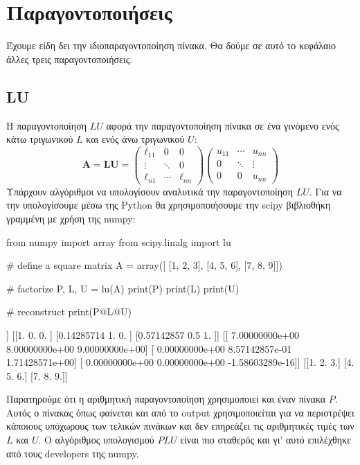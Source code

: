 \chapter{Παραγοντοποιήσεις}
Έχουμε είδη δει την ιδιοπαραγοντοποίηση πίνακα. Θα δούμε σε αυτό το κεφάλαιο άλλες τρεις παραγοντοποιήσεις. 
\section{{\en LU}}
Η παραγοντοποίηση $LU$ αφορά την παραγοντοποίηση πίνακα σε ένα γινόμενο ενός κάτω τριγωνικού $L$ και ενός άνω τριγωνικού $U$:
\begin{equation}
\mathbf{A} = \mathbf{L}\mathbf{U} =
\left( \begin{array}{ccc}
\ell_{11} & 0 & 0 \\
\vdots & \ddots & 0 \\
\ell_{n1} & \cdots & \ell_{nn}
\end{array}\right)
\left( 
\begin{array}{ccc}
u_{11} & \cdots & u_{nn} \\
0 & \ddots & \vdots \\
0 & 0 & u_{nn}
\end{array}
\right)
\end{equation}
Υπάρχουν αλγόριθμοι να υπολογίσουν αναλυτικά την παραγοντοποίηση $LU$. Για να την υπολογίσουμε μέσω της {\en Python} θα χρησιμοποιήσουμε την {\en scipy} βιβλιοθήκη γραμμένη με χρήση της {\en numpy}:
\en
\begin{python}
from numpy import array
from scipy.linalg import lu

# define a square matrix
A = array([
[1, 2, 3],
[4, 5, 6],
[7, 8, 9]])

# factorize
P, L, U = lu(A)
print(P)
print(L)
print(U)

# reconstruct
print(P@L@U)
\end{python}
\vspace*{-0.7cm}
\begin{codeout}
[[0. 1. 0.]
 [0. 0. 1.]
 [1. 0. 0.]]
[[1.         0.         0.        ]
 [0.14285714 1.         0.        ]
 [0.57142857 0.5        1.        ]]
[[ 7.00000000e+00  8.00000000e+00  9.00000000e+00]
 [ 0.00000000e+00  8.57142857e-01  1.71428571e+00]
 [ 0.00000000e+00  0.00000000e+00 -1.58603289e-16]]
[[1. 2. 3.]
 [4. 5. 6.]
 [7. 8. 9.]]
\end{codeout}
\gr
Παρατηρούμε ότι η αριθμητική παραγοντοποίηση χρησιμοποιεί και έναν πίνακα $P$. Αυτός ο πίνακας όπως φαίνεται και από το {\en output} χρησιμοποιείται για να περιστρέψει κάποιους υπόχωρους των τελικών πινάκων και δεν επηρεάζει τις αριθμητικές τιμές των $L$ και $U$. Ο αλγόριθμος υπολογισμού $PLU$ είναι πιο σταθερός και γι' αυτό επιλέχθηκε από τους {\en developers} της {\en numpy}.
